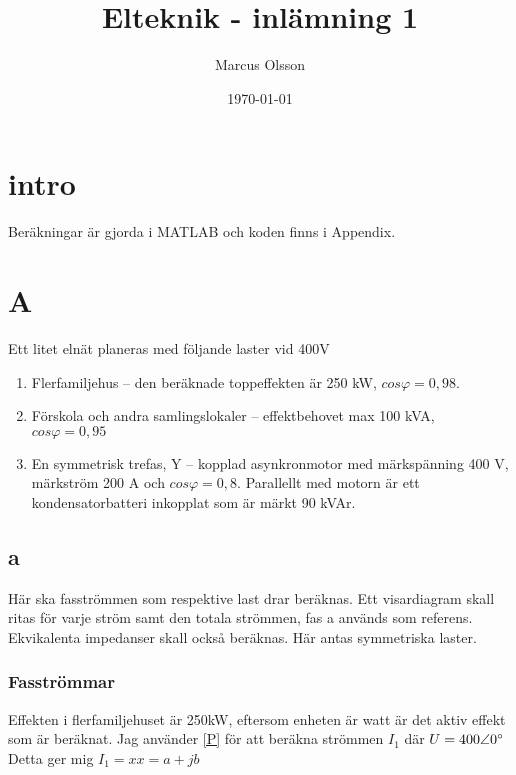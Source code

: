 \documentclass{article}
\title{Elteknik - inlämning 1} %
\author{
	\begin{tabular}{l r}
    Marcus Olsson \\
    \\
    \end{tabular}
    }
\date{\today} %
\begin{document}
\maketitle %
\tableofcontents
\clearpage
\section{intro}
Beräkningar är gjorda i MATLAB och koden finns i Appendix.

\section{A}
Ett litet elnät planeras med följande laster vid 400V

\begin{enumerate}
	\item Flerfamiljehus – den beräknade toppeffekten är 250 kW, $cos\varphi = 0,98$.
	\item Förskola och andra samlingslokaler – effektbehovet max 100 kVA, $cos\varphi = 0,95$
	\item En symmetrisk trefas, Y – kopplad asynkronmotor med märkspänning 400 V,
märkström 200 A och $cos\varphi = 0,8$. Parallellt med motorn är ett kondensatorbatteri
inkopplat som är märkt 90 kVAr.
\end{enumerate}

\subsection{a}
Här ska fasströmmen som respektive last drar beräknas.
Ett visardiagram skall ritas för varje ström samt den totala strömmen, fas a används som referens.
Ekvikalenta impedanser skall också beräknas.
Här antas symmetriska laster.

  \subsubsection{Fasströmmar}
  Effekten i flerfamiljehuset är 250kW, eftersom enheten är watt är det aktiv effekt som är beräknat.
  Jag använder \ref{P} för att beräkna strömmen $I_1$ där $U=400\angle{0\degree}$
  Detta ger mig $I_1=xx=a+jb$
\end{document}
